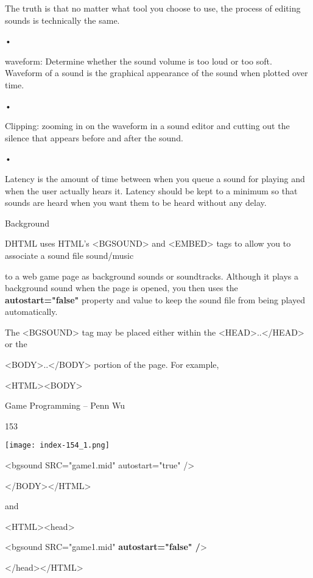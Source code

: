 \documentclass[
]{article}
\begin{document}
The truth is that no matter what tool you choose to use, the process of
editing sounds is technically the same.

•

waveform: Determine whether the sound volume is too loud or too soft.
Waveform of a sound is the graphical appearance of the sound when
plotted over time.

•

Clipping: zooming in on the waveform in a sound editor and cutting out
the silence that appears before and after the sound.

•

Latency is the amount of time between when you queue a sound for playing
and when the user actually hears it. Latency should be kept to a minimum
so that sounds are heard when you want them to be heard without any
delay.

Background

DHTML uses HTML's \textless BGSOUND\textgreater{} and
\textless EMBED\textgreater{} tags to allow you to associate a sound
file sound/music

to a web game page as background sounds or soundtracks. Although it
plays a background sound when the page is opened, you then uses the
\textbf{autostart="false"} property and value to keep the sound file
from being played automatically.

The \textless BGSOUND\textgreater{} tag may be placed either within the
\textless HEAD\textgreater..\textless/HEAD\textgreater{} or the

\textless BODY\textgreater..\textless/BODY\textgreater{} portion of the
page. For example,

\textless HTML\textgreater\textless BODY\textgreater{}

Game Programming -- Penn Wu

153

\protect\hypertarget{index_split_010.htmlux5cux23p154}{}{}\texttt{[image: index-154\_1.png]}

\textless bgsound SRC="game1.mid" autostart="true" /\textgreater{}

\textless/BODY\textgreater\textless/HTML\textgreater{}

and

\textless HTML\textgreater\textless head\textgreater{}

\textless bgsound SRC="game1.mid" \textbf{autostart="false"
/}\textgreater{}

\textless/head\textgreater\textless/HTML\textgreater{}
\end{document}
